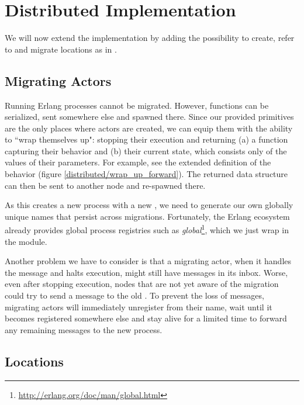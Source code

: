 \section{Distributed Implementation}

We will now extend the implementation by adding the possibility to
create, refer to and migrate locations as in \distjoincalc.


\subsection{Migrating Actors}
\label{ch_migration}

Running Erlang processes cannot be migrated.
However, functions can be serialized, sent somewhere else and spawned there.
Since our provided primitives are the only places where actors are created,
we can equip them with the ability to ``wrap themselves up":
stopping their execution and returning
(a) a function capturing their behavior and
(b) their current state, which consists only of the values of their parameters.
For example, see the extended definition of the  behavior
(figure \ref{distributed/wrap_up_forward}).
The returned data structure can then be sent to another node
and re-spawned there.


As this creates a new process with a new \PID,
we need to generate our own globally unique names
that persist across migrations.
Fortunately, the Erlang ecosystem already provides global process registries
such as \emph{global}\footnote{\url{http://erlang.org/doc/man/global.html}},
which we just wrap in the  module.


Another problem we have to consider is that a migrating actor,
when it handles the  message and halts execution,
might still have messages in its inbox.
Worse, even after stopping execution,
nodes that are not yet aware of the migration
could try to send a message to the old \PID.
To prevent the loss of messages, migrating actors will immediately unregister
from their name, wait until it becomes registered somewhere else
and stay alive for a limited time to forward any remaining messages
to the new process.


\subsection{Locations}

